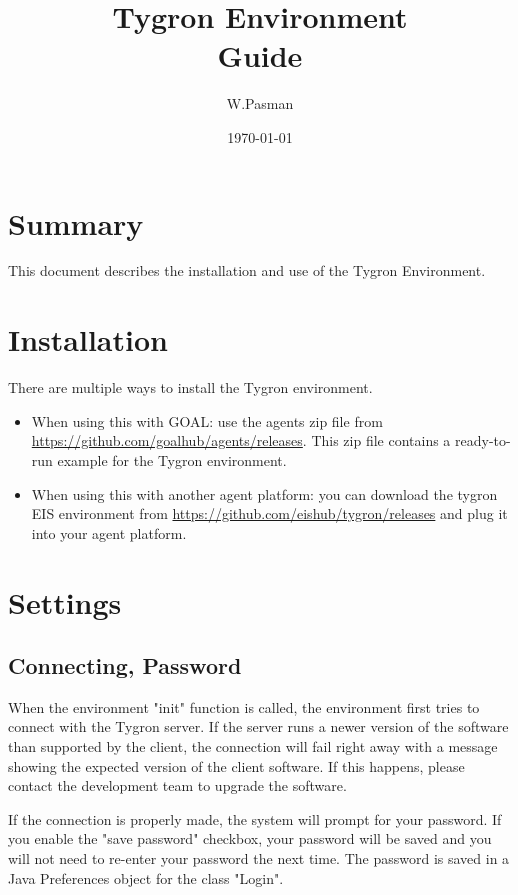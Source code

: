 \documentclass[english,11pt]{article}
\title{Tygron Environment \\ Guide}
\author{W.Pasman}
\date{\today}
\begin{document}
\maketitle

\newpage
\tableofcontents
\newpage

\section{Summary}

This document describes the installation and use of the Tygron Environment.

\section{Installation}
There are multiple ways to install the Tygron environment. 
\begin{itemize}
\item When using this with GOAL: use the agents zip file from \url{https://github.com/goalhub/agents/releases}. This zip file contains a ready-to-run example for the Tygron environment. 
\item When using this with another agent platform: you can download the tygron EIS environment from 
\url{https://github.com/eishub/tygron/releases} and plug it into your agent platform. 
\end{itemize}

\section{Settings}
\subsection{Connecting, Password}
When the environment "init" function is called, the environment first tries to connect with the Tygron server.
If the server runs a newer version of the software than supported by the client, the connection will fail right away with a message showing the expected version of the client software. If this happens, please contact the development team to upgrade the software.

If the connection is properly made, the system will prompt for your password. If you enable the "save password" checkbox, your password will be saved and you will not need to re-enter your password the next time. The password is saved in a Java Preferences object for the class "Login".
\end{document}
